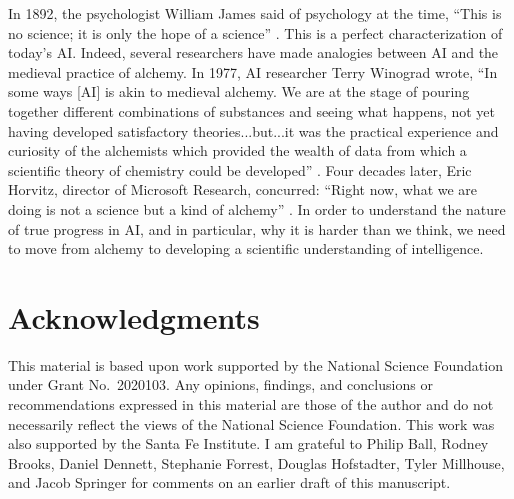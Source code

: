 \documentclass[12pt]{article}
\begin{document}
In 1892, the psychologist William James said of psychology at the time, ``This is no science; it is only the hope of a science'' \cite{James1892}.  This is a perfect characterization of today's AI. Indeed, several researchers have made analogies between AI and the medieval practice of alchemy.  In 1977, AI researcher Terry Winograd wrote, ``In some ways [AI] is akin to medieval alchemy.  We are at the stage of pouring together different combinations of substances and seeing what happens, not yet having developed satisfactory theories...but...it was the practical experience and curiosity of the alchemists which provided the wealth of data from which a scientific theory of chemistry could be developed'' \cite{Winograd1977}.  Four decades later, Eric Horvitz, director of Microsoft Research, concurred: ``Right now, what we are doing is not a science but a kind of alchemy'' \cite{Metz2017}.  In order to understand the nature of true progress in AI, and in particular, why it is harder than we think, we need to move from alchemy to developing a scientific understanding of intelligence.

\pagebreak

\section*{Acknowledgments}  
This material is based upon work supported by the National Science Foundation under Grant No.\ 2020103.  Any opinions, findings, and conclusions or recommendations expressed in this material are those of the author and do not necessarily reflect the views of the National Science Foundation. This work was also supported by the Santa Fe Institute.  I am grateful to Philip Ball, Rodney Brooks, Daniel Dennett, Stephanie Forrest, Douglas Hofstadter, Tyler Millhouse, and Jacob Springer for comments on an earlier draft of this manuscript.  


\end{document}
